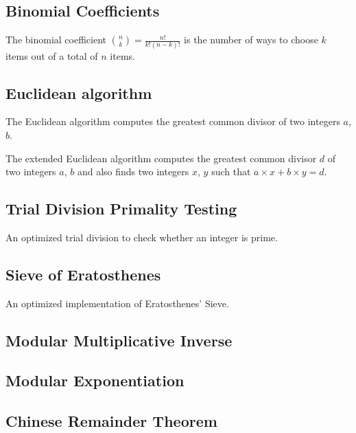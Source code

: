 \documentclass[11pt,a4paper,titlepage]{article}
\begin{document}
		\subsection{Binomial Coefficients}
			The binomial coefficient $\binom{n}{k} = \frac{n!}{k!(n-k)!}$ is the number of ways to choose $k$ items out of a total of $n$ items.

			

			

			

		\subsection{Euclidean algorithm}
			The Euclidean algorithm computes the greatest common divisor of two integers $a$, $b$.
			

			The extended Euclidean algorithm computes the greatest common divisor $d$ of two integers $a$, $b$ and also finds two integers $x$, $y$ such that $a\times x + b\times y = d$.
			

		\subsection{Trial Division Primality Testing}
			An optimized trial division to check whether an integer is prime.
			

		\subsection{Sieve of Eratosthenes}
			An optimized implementation of Eratosthenes' Sieve.
			

		\subsection{Modular Multiplicative Inverse}
			

		\subsection{Modular Exponentiation}
			

		\subsection{Chinese Remainder Theorem}
			
\end{document}
